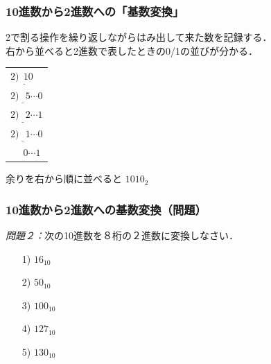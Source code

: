 \documentclass[handout]{beamer}        %
\begin{document}
\begin{frame}
  \frametitle{10進数から2進数への「基数変換」}
2で割る操作を繰り返しながらはみ出して来た数を記録する．\\
右から並べると2進数で表したときの0/1の並びが分かる．

\begin{center}
\begin{minipage}{0.5\columnwidth}
\begin{flushright}
\begin{tabular}{l}
$2 \underline{) ~~10 } $\\
$2 \underline{) ~~~5  } {\cdots 0}$ \\
$2 \underline{) ~~~2  } {\cdots 1}$ \\
$2 \underline{) ~~~1  } {\cdots 0}$ \\
$~~            ~~~~0    {\cdots 1}$
\end{tabular}
\end{flushright}
\end{minipage}
\begin{minipage}{0.4\columnwidth}
余りを右から順に並べると $1010_2$
\end{minipage}
\end{center}
\end{frame}

\begin{frame}
  \frametitle{10進数から2進数への基数変換（問題）}

\emph{問題２：}次の10進数を８桁の２進数に変換しなさい．
\begin{enumerate}
\item[1)] $16_{10}$
\vfill
\item[2)] $50_{10}$
\vfill
\item[3)] $100_{10}$
\vfill
\item[4)] $127_{10}$
\vfill
\item[5)] $130_{10}$
\vfill
\end{enumerate}
\end{frame}
\end{document}

